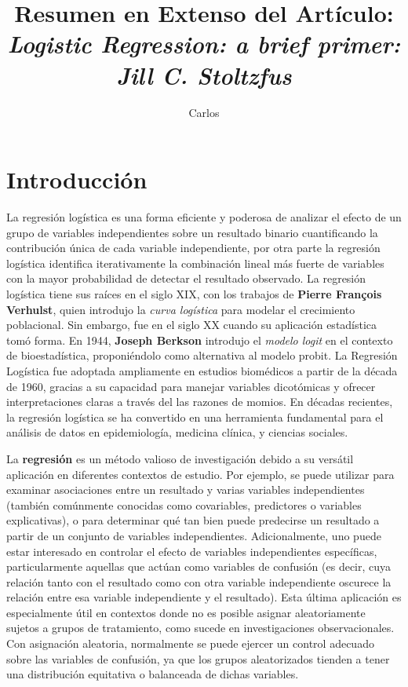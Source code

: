 \documentclass[12pt]{article}
\title{Resumen en Extenso del Art\'iculo: \\
\textit{Logistic Regression: a brief primer: Jill C. Stoltzfus}}
\author{Carlos}
\date{}
\begin{document}
\maketitle
\tableofcontents

\section{Introducci\'on}
La regresi\'on log\'istica es una forma eficiente y poderosa de analizar el efecto de un grupo de variables independientes sobre un resultado binario cuantificando la contribuci\'on \'unica de cada variable independiente, por otra parte la regresi\'on log\'istica identifica iterativamente la combinaci\'on lineal m\'as fuerte de variables con la mayor probabilidad de detectar el resultado observado. La regresi\'on log\'istica tiene sus ra\'ices en el siglo XIX, con los trabajos de \textbf{Pierre François Verhulst}, quien introdujo la \textit{curva log\'istica} para modelar el crecimiento poblacional. Sin embargo, fue en el siglo XX cuando su aplicaci\'on estad\'istica tom\'o forma. En 1944, \textbf{Joseph Berkson} introdujo el \textit{modelo logit} en el contexto de bioestad\'istica, proponi\'endolo como alternativa al modelo probit. La Regresi\'on Log\'istica fue adoptada ampliamente en estudios biom\'edicos a partir de la d\'ecada de 1960, gracias a su capacidad para manejar variables dicot\'omicas y ofrecer interpretaciones claras a trav\'es del las razones de momios. En d\'ecadas recientes, la regresi\'on log\'istica se ha convertido en una herramienta fundamental para el an\'alisis de datos en epidemiolog\'ia, medicina cl\'inica, y ciencias sociales. 

La \textbf{regresi\'on} es un m\'etodo valioso de investigaci\'on debido a su vers\'atil aplicaci\'on en diferentes contextos de estudio. Por ejemplo, se puede utilizar para examinar asociaciones entre un resultado y varias variables independientes (tambi\'en com\'unmente conocidas como covariables, predictores o variables explicativas)\cite{darlington1990}, o para determinar qu\'e tan bien puede predecirse un resultado a partir de un conjunto de variables independientes\cite{darlington1990,tabachnick2007}. Adicionalmente, uno puede estar interesado en controlar el efecto de variables independientes espec\'ificas, particularmente aquellas que act\'uan como variables de confusi\'on (es decir, cuya relaci\'on tanto con el resultado como con otra variable independiente oscurece la relaci\'on entre esa variable independiente y el resultado)\cite{darlington1990,hosmer2000}. Esta \'ultima aplicaci\'on es especialmente \'util en contextos donde no es posible asignar aleatoriamente sujetos a grupos de tratamiento, como sucede en investigaciones observacionales. Con asignaci\'on aleatoria, normalmente se puede ejercer un control adecuado sobre las variables de confusi\'on, ya que los grupos aleatorizados tienden a tener una distribuci\'on equitativa o balanceada de dichas variables\cite{campbell1963}.
\end{document}
